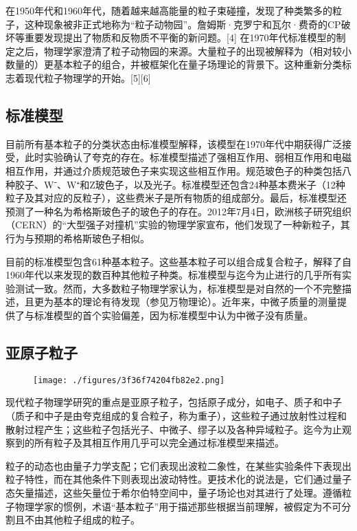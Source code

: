 在1950年代和1960年代，随着越来越高能量的粒子束碰撞，发现了种类繁多的粒子，这种现象被非正式地称为“粒子动物园”。詹姆斯·克罗宁和瓦尔·费奇的CP破坏等重要发现提出了物质和反物质不平衡的新问题。[4] 在1970年代标准模型的制定之后，物理学家澄清了粒子动物园的来源。大量粒子的出现被解释为（相对较小数量的）更基本粒子的组合，并被框架化在量子场理论的背景下。这种重新分类标志着现代粒子物理学的开始。[5][6]
\subsection{标准模型}  
目前所有基本粒子的分类状态由标准模型解释，该模型在1970年代中期获得广泛接受，此时实验确认了夸克的存在。标准模型描述了强相互作用、弱相互作用和电磁相互作用，并通过介质规范玻色子来实现这些相互作用。规范玻色子的种类包括八种胶子、W⁻、W⁺和Z玻色子，以及光子。标准模型还包含24种基本费米子（12种粒子及其对应的反粒子），这些费米子是所有物质的组成部分。最后，标准模型还预测了一种名为希格斯玻色子的玻色子的存在。2012年7月4日，欧洲核子研究组织（CERN）的“大型强子对撞机”实验的物理学家宣布，他们发现了一种新粒子，其行为与预期的希格斯玻色子相似。

目前的标准模型包含61种基本粒子。这些基本粒子可以组合成复合粒子，解释了自1960年代以来发现的数百种其他粒子种类。标准模型与迄今为止进行的几乎所有实验测试一致。然而，大多数粒子物理学家认为，标准模型是对自然的一个不完整描述，且更为基本的理论有待发现（参见万物理论）。近年来，中微子质量的测量提供了与标准模型的首个实验偏差，因为标准模型中认为中微子没有质量。
\subsection{亚原子粒子}
\begin{figure}[ht]
\centering
\texttt{[image: ./figures/3f36f74204fb82e2.png]}
\caption{} \label{fig_Partic_2}
\end{figure}
现代粒子物理学研究的重点是亚原子粒子，包括原子成分，如电子、质子和中子（质子和中子是由夸克组成的复合粒子，称为重子），这些粒子通过放射性过程和散射过程产生；这些粒子包括光子、中微子、缪子以及各种异域粒子。迄今为止观察到的所有粒子及其相互作用几乎可以完全通过标准模型来描述。

粒子的动态也由量子力学支配；它们表现出波粒二象性，在某些实验条件下表现出粒子特性，而在其他条件下则表现出波动特性。更技术化的说法是，它们通过量子态矢量描述，这些矢量位于希尔伯特空间中，量子场论也对其进行了处理。遵循粒子物理学家的惯例，术语“基本粒子”用于描述那些根据当前理解，被假定为不可分割且不由其他粒子组成的粒子。
